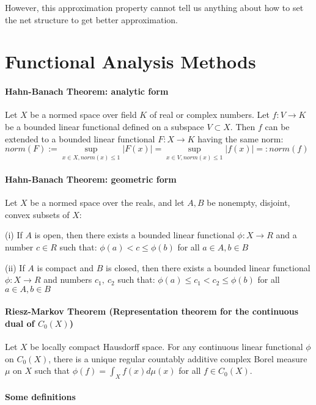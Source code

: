 However, this approximation property cannot tell us anything about how to set the net structure to get better approximation.


\section{Functional Analysis Methods}
\paragraph{Hahn-Banach Theorem: analytic form}
Let $X$ be a normed space over field $K$ of real or complex numbers. Let $f:V\rightarrow K$ be a bounded linear functional defined on a subspace $V\subset X$. Then $f$ can be extended to a bounded linear functional $F:X \rightarrow K$ having the same norm: $norm(F):=\mathop{sup} \limits_{x\in X,norm(x)\le 1}|F(x)|=\mathop{sup} \limits_{x\in V,norm(x)\le 1}|f(x)|=:norm(f)$

\paragraph{Hahn-Banach Theorem: geometric form}

Let $X$ be a normed space over the reals, and let $A,B$ be nonempty, disjoint, convex subsets of $X$:

(i) If $A$ is open, then there exists a bounded linear functional $\phi: X\rightarrow R$ and a number $c\in R$ such that: $\phi(a)<c\le\phi(b)$ for all $a\in A, b\in B$

(ii) If $A$ is compact and $B$ is closed, then there exists a bounded linear functional $\phi: X\rightarrow R$ and numbers $c_1, \ c_2$ such that: $\phi(a)\le c_1<c_2\le \phi(b)$ for all $a\in A, b\in B$

\paragraph{Riesz-Markov Theorem (Representation theorem for the continuous dual of $C_0(X)$)}

Let $X$ be locally compact Hausdorff space. For any continuous linear functional $\phi$ on $C_0(X)$, there is a unique regular countably additive complex Borel measure $\mu$ on $X$ such that $\phi(f)=\int_Xf(x)d\mu(x)$ for all $f\in C_0(X)$.

\paragraph{Some definitions}

